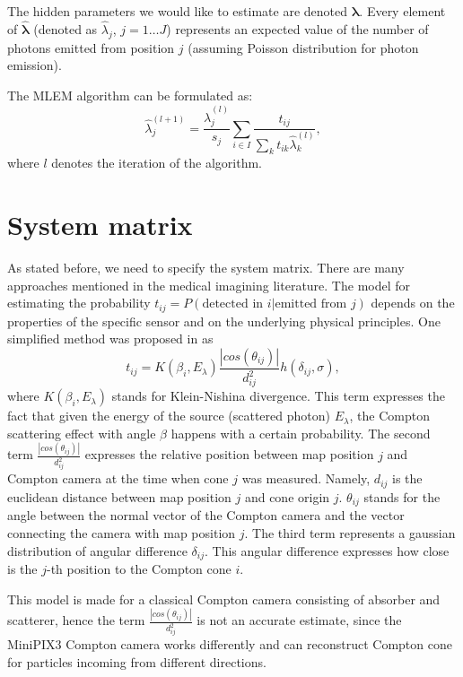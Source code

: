 The hidden parameters we would like to estimate are denoted $\bm{\hat{\lambda}}$.
Every element of $\bm{\hat{\lambda}}$ (denoted as $\hat{\lambda}_{j}$, $j = 1 \dotsc J$) represents an expected value of the number of photons emitted from position $j$ (assuming Poisson distribution for photon emission).

The \ac{MLEM} algorithm can be formulated as:
\begin{equation}
\hat{\lambda}_{j}^{(l+1)} = \frac{\hat{\lambda}_{j}^{(l)}}{s_{j}} \sum_{i \in I} \frac{t_{ij}}{\sum_{k} t_{ik} \hat{\lambda}_{k}^{(l)}},
  \label{eq:MLEM}
\end{equation}
where $l$ denotes the iteration of the algorithm.

\section{System matrix}
As stated before, we need to specify the system matrix.
There are many approaches mentioned in the medical imagining literature.
The model for estimating the probability $t_{ij} = P(\textrm{detected in } i | \textrm{emitted from } j)$ depends on the properties of the specific sensor and on the underlying physical principles.
One simplified method was proposed in \cite{maxim2016} as
\begin{equation}
  t_{ij} = K(\beta_{i},E_{\lambda})   \frac{\left| cos(\theta_{ij}) \right|}{d^{2}_{ij}} h(\delta_{ij}, \sigma),
\end{equation}
where $K(\beta_{i},E_{\lambda})$ stands for Klein-Nishina divergence. 
This term expresses the fact that given the energy of the source (scattered photon) $E_{\lambda}$, the Compton scattering effect with angle $\beta$ happens with a certain probability. 
The second term  $\frac{\left| cos(\theta_{ij}) \right|}{d^{2}_{ij}}$ expresses the relative position between map position $j$ and Compton camera at the time when cone $j$ was measured.
Namely, $d_{ij}$ is the euclidean distance between map position $j$ and cone origin $j$.
$\theta_{ij}$ stands for the angle between the normal vector of the Compton camera and the vector connecting the camera with map position $j$. 
The third term represents a gaussian distribution of angular difference $\delta_{ij}$. 
This angular difference expresses how close is the $j$-th position to the Compton cone $i$.

This model is made for a classical Compton camera consisting of absorber and scatterer, hence the term $\frac{\left| cos(\theta_{ij}) \right|}{d^{2}_{ij}}$ is not an accurate estimate, since the MiniPIX3 Compton camera works differently and can reconstruct Compton cone for particles incoming from different directions.

